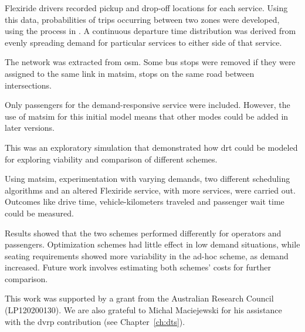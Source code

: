 %

Flexiride drivers recorded pickup and drop-off locations for each service. Using this data, probabilities of trips
occurring between two zones were developed, using the process in
\citet[][]{Deflorio_ITSIET_2011}. A continuous departure time distribution was
derived from evenly spreading demand for particular services to either side
of that service. 


The network was extracted from \gls{osm}. Some bus stops were removed if they were assigned to the same link in \gls{matsim}, \eg stops on the same road between intersections.

Only passengers for the demand-responsive service were included. However, the use of \gls{matsim} for this initial model means that other modes could be added in later versions.


This was an exploratory simulation that demonstrated how \gls{drt} could be modeled for exploring viability and comparison of different schemes.

Using \gls{matsim}, experimentation with varying demands, two different scheduling
algorithms and an altered Flexiride service, with more services, were
carried out. Outcomes like drive time, vehicle-kilometers traveled and
passenger wait time could be measured.

Results showed that the two schemes performed differently for operators and
passengers. Optimization schemes had little effect in low demand situations, while
seating requirements showed more variability in the ad-hoc scheme, as demand
increased. Future work involves estimating  both schemes' costs for further
comparison.

This work was supported by a grant from the Australian Research Council (LP120200130). We are also grateful to Michal Maciejewski for his assistance with the \gls{dvrp} \gls{contribution} (see Chapter~\ref{ch:dts}). 
